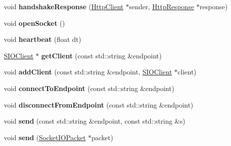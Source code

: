 \begin{DoxyCompactItemize}
void {\bfseries handshake\+Response} (\hyperlink{classnetwork_1_1HttpClient}{Http\+Client} $\ast$sender, \hyperlink{classnetwork_1_1HttpResponse}{Http\+Response} $\ast$response)
\item 
\mbox{\label{classnetwork_1_1SIOClientImpl_a47fefbb644764f194b796f4c23fed7be}} 
void {\bfseries open\+Socket} ()
\item 
\mbox{\label{classnetwork_1_1SIOClientImpl_af5bf5027b80e040648b8db221c7ae739}} 
void {\bfseries heartbeat} (float dt)
\item 
\mbox{\label{classnetwork_1_1SIOClientImpl_ada6175cdc2e1885d5e8e7d3722aecc62}} 
\hyperlink{classnetwork_1_1SIOClient}{S\+I\+O\+Client} $\ast$ {\bfseries get\+Client} (const std\+::string \&endpoint)
\item 
\mbox{\label{classnetwork_1_1SIOClientImpl_a50ea877f490dece3f0a31e1ec47025b2}} 
void {\bfseries add\+Client} (const std\+::string \&endpoint, \hyperlink{classnetwork_1_1SIOClient}{S\+I\+O\+Client} $\ast$client)
\item 
\mbox{\label{classnetwork_1_1SIOClientImpl_af11714fef5c093b3adbfcf12f88d6ea0}} 
void {\bfseries connect\+To\+Endpoint} (const std\+::string \&endpoint)
\item 
\mbox{\label{classnetwork_1_1SIOClientImpl_ab03d285b0ff9ccc84da731832fadb0b3}} 
void {\bfseries disconnect\+From\+Endpoint} (const std\+::string \&endpoint)
\item 
\mbox{\label{classnetwork_1_1SIOClientImpl_aa86efa7432a42df79cd6c9664349875c}} 
void {\bfseries send} (const std\+::string \&endpoint, const std\+::string \&s)
\item 
\mbox{\label{classnetwork_1_1SIOClientImpl_a7b89123266553af721b63e1e1515e95c}} 
void {\bfseries send} (\hyperlink{classnetwork_1_1SocketIOPacket}{Socket\+I\+O\+Packet} $\ast$packet)
\item 
\mbox{\label{classnetwork_1_1SIOClientImpl_a6c99989b74064a444178db0f05674eae}} 

\end{DoxyCompactItemize}
